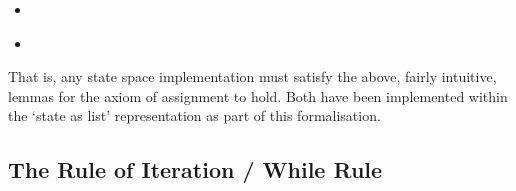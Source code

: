 \documentclass[oneside,12pt]{article}
\begin{document}
\begin{itemize}
  \small
\item {}\AgdaSpace{}\AgdaSymbol{:}\vspace{0.5\baselineskip}\\
  \hspace*{6em}\AgdaSpace{}\AgdaSpace{}\AgdaSpace{}\AgdaSpace{}\AgdaSpace{}\AgdaSpace{}\AgdaSymbol{(}\AgdaSpace{}\AgdaSpace{}\AgdaSpace{}\AgdaSymbol{)}\AgdaSpace{}\AgdaSpace{}\AgdaSpace{}
\item {}\AgdaSpace{}\AgdaSymbol{:}\AgdaSpace{}\vspace{0.5\baselineskip}\\
  \hspace*{0.1em}\AgdaSpace{}\AgdaSpace{}\AgdaSpace{}\AgdaSpace{}\AgdaSpace{}\AgdaSpace{}\AgdaSpace{}\AgdaSpace{}\AgdaSpace{}\AgdaSpace{}\AgdaSymbol{(}\AgdaSpace{}\AgdaSymbol{:}\AgdaSpace{}\AgdaSymbol{)}\AgdaSpace{}\AgdaSpace{}\AgdaSpace{}\AgdaSymbol{(}\AgdaSpace{}\AgdaSpace{}\AgdaSpace{}\AgdaSymbol{)}\AgdaSpace{}\AgdaSpace{}\AgdaSpace{}\AgdaSpace{}
\end{itemize}

That is, any state space implementation must satisfy the above, fairly intuitive, lemmas for the axiom of assignment to hold. Both have been implemented within the `state as list' representation as part of this \mbox{formalisation.}


\subsection{The Rule of Iteration / While Rule}
\end{document}
